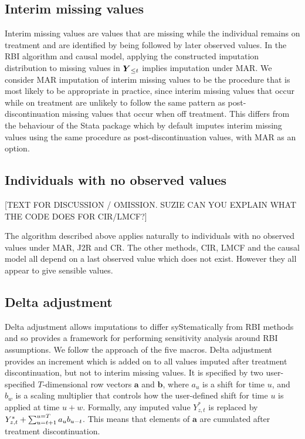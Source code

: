 \subsection{Interim missing values}

Interim missing values are values that are missing while the individual remains on treatment and are identified by being followed by later observed values. 
In the RBI algorithm and causal model, applying the constructed imputation distribution to missing values in $\boldsymbol{Y}_{{\le{t}}}$ implies imputation under MAR.
We consider MAR imputation of interim missing values to be the procedure that is most likely to be appropriate in practice, since interim missing values that occur while on treatment are unlikely to follow the same pattern as post-discontinuation missing values that occur when off treatment. 
This differs from the behaviour of the Stata package \citep{Cro++16} which by default imputes interim missing values using the same procedure as post-discontinuation values, with MAR as an option.

\subsection{Individuals with no observed values}

[TEXT FOR DISCUSSION / OMISSION. SUZIE CAN YOU EXPLAIN WHAT THE CODE DOES FOR CIR/LMCF?]

The algorithm described above applies naturally to individuals with no observed values under MAR, J2R and CR. 
The other methods, CIR, LMCF and the causal model all depend on a last observed value which does not exist. However they all appear to give sensible values.




\subsection{Delta adjustment}

Delta adjustment allows imputations to differ syStematically from RBI methods and so provides a framework for performing sensitivity analysis around RBI assumptions.
We follow the approach of the five macros. 
Delta adjustment provides an increment which is added on to all values imputed after treatment discontinuation, but not to interim missing values. 
It is specified by two user-specified $T$-dimensional row vectors $\boldsymbol{a}$ and $\boldsymbol{b}$,
where $a_u$ is a shift for time $u$, 
and $b_w$ is a scaling multiplier that controls how the user-defined shift for time $u$ is applied at time $u+w$.
Formally, any imputed value $Y^*_{z,t}$ is replaced by $Y^*_{z,t} + \sum_{u=t+1}^{u=T} a_u b_{u-t}$.
This means that elements of $\boldsymbol{a}$  are cumulated after treatment discontinuation. 

